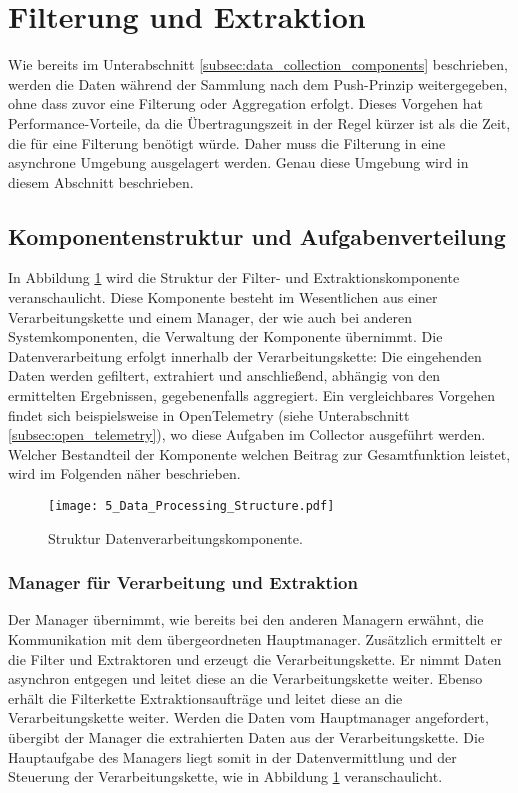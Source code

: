 \section{Filterung und Extraktion}
\label{sec:data_extraction_concept}
Wie bereits im Unterabschnitt \ref{subsec:data_collection_components} beschrieben, werden die Daten während der Sammlung nach dem Push-Prinzip weitergegeben, ohne dass zuvor eine Filterung oder Aggregation erfolgt. Dieses Vorgehen hat Performance-Vorteile, da die Übertragungszeit in der Regel kürzer ist als die Zeit, die für eine Filterung benötigt würde. Daher muss die Filterung in eine asynchrone Umgebung ausgelagert werden. Genau diese Umgebung wird in diesem Abschnitt beschrieben.

\subsection{Komponentenstruktur und Aufgabenverteilung}
In Abbildung \ref{fig:structure_data_processing} wird die Struktur der Filter- und Extraktionskomponente veranschaulicht.
Diese Komponente besteht im Wesentlichen aus einer Verarbeitungskette und einem Manager, der wie auch bei anderen Systemkomponenten, die Verwaltung der Komponente übernimmt. Die Datenverarbeitung erfolgt innerhalb der Verarbeitungskette: Die eingehenden Daten werden gefiltert, extrahiert und anschließend, abhängig von den ermittelten Ergebnissen, gegebenenfalls aggregiert. Ein vergleichbares Vorgehen findet sich beispielsweise in OpenTelemetry (siehe Unterabschnitt \ref{subsec:open_telemetry}), wo diese Aufgaben im Collector ausgeführt werden. Welcher Bestandteil der Komponente welchen Beitrag zur Gesamtfunktion leistet, wird im Folgenden näher beschrieben.

\begin{figure}[H]
\centering
\texttt{[image: 5\_Data\_Processing\_Structure.pdf]}
\caption{Struktur Datenverarbeitungskomponente.}
\label{fig:structure_data_processing}
\end{figure}

\subsubsection{Manager für Verarbeitung und Extraktion}
Der Manager übernimmt, wie bereits bei den anderen Managern erwähnt, die Kommunikation mit dem übergeordneten Hauptmanager. Zusätzlich ermittelt er die Filter und Extraktoren und erzeugt die Verarbeitungskette. Er nimmt Daten asynchron entgegen und leitet diese an die Verarbeitungskette weiter. Ebenso erhält die Filterkette Extraktionsaufträge und leitet diese an die Verarbeitungskette weiter. Werden die Daten vom Hauptmanager angefordert, übergibt der Manager die extrahierten Daten aus der Verarbeitungskette. Die Hauptaufgabe des Managers liegt somit in der Datenvermittlung und der Steuerung der Verarbeitungskette, wie in Abbildung \ref{fig:structure_data_processing} veranschaulicht.

